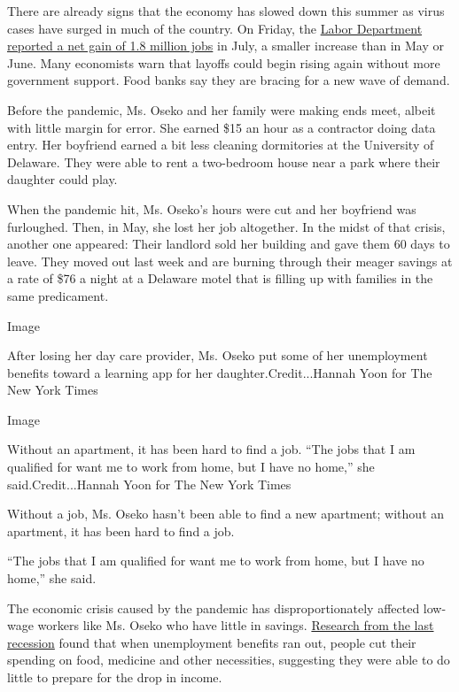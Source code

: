 There are already signs that the economy has slowed down this summer as
virus cases have surged in much of the country. On Friday, the
\href{https://www.nytimes.com/2020/08/07/business/economy/july-jobs-report.html}{Labor
Department reported a net gain of 1.8 million jobs} in July, a smaller
increase than in May or June. Many economists warn that layoffs could
begin rising again without more government support. Food banks say they
are bracing for a new wave of demand.

Before the pandemic, Ms. Oseko and her family were making ends meet,
albeit with little margin for error. She earned \$15 an hour as a
contractor doing data entry. Her boyfriend earned a bit less cleaning
dormitories at the University of Delaware. They were able to rent a
two-bedroom house near a park where their daughter could play.

When the pandemic hit, Ms. Oseko's hours were cut and her boyfriend was
furloughed. Then, in May, she lost her job altogether. In the midst of
that crisis, another one appeared: Their landlord sold her building and
gave them 60 days to leave. They moved out last week and are burning
through their meager savings at a rate of \$76 a night at a Delaware
motel that is filling up with families in the same predicament.

Image

After losing her day care provider, Ms. Oseko put some of her
unemployment benefits toward a learning app for her
daughter.Credit...Hannah Yoon for The New York Times

Image

Without an apartment, it has been hard to find a job. ``The jobs that I
am qualified for want me to work from home, but I have no home,'' she
said.Credit...Hannah Yoon for The New York Times

Without a job, Ms. Oseko hasn't been able to find a new apartment;
without an apartment, it has been hard to find a job.

``The jobs that I am qualified for want me to work from home, but I have
no home,'' she said.

The economic crisis caused by the pandemic has disproportionately
affected low-wage workers like Ms. Oseko who have little in savings.
\href{https://www.aeaweb.org/articles?id=10.1257/aer.20170537}{Research
from the last recession} found that when unemployment benefits ran out,
people cut their spending on food, medicine and other necessities,
suggesting they were able to do little to prepare for the drop in
income.

